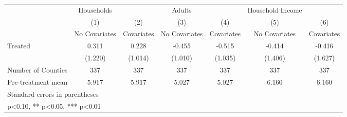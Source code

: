 {
\def\sym#1{\ifmmode^{#1}\else\(^{#1}\)\fi}
\begin{tabular}{l*{6}{c}}
\hline\hline
            &  Households   &               &      Adults   &               &Household Income   &               \\
            &\multicolumn{1}{c}{(1)}&\multicolumn{1}{c}{(2)}&\multicolumn{1}{c}{(3)}&\multicolumn{1}{c}{(4)}&\multicolumn{1}{c}{(5)}&\multicolumn{1}{c}{(6)}\\
            &\multicolumn{1}{c}{No Covariates}&\multicolumn{1}{c}{Covariates}&\multicolumn{1}{c}{No Covariates}&\multicolumn{1}{c}{Covariates}&\multicolumn{1}{c}{No Covariates}&\multicolumn{1}{c}{Covariates}\\
\hline
Treated     &       0.311   &       0.228   &      -0.455   &      -0.515   &      -0.414   &      -0.416   \\
            &     (1.220)   &     (1.014)   &     (1.010)   &     (1.035)   &     (1.406)   &     (1.627)   \\
\hline
Number of Counties&         337   &         337   &         337   &         337   &         337   &         337   \\
Pre-treatment mean&       5.917   &       5.917   &       5.027   &       5.027   &       6.160   &       6.160   \\
\hline\hline
\multicolumn{7}{l}{\footnotesize Standard errors in parentheses}\\
\multicolumn{7}{l}{\footnotesize * p<0.10, ** p<0.05, *** p<0.01}\\
\end{tabular}
}
